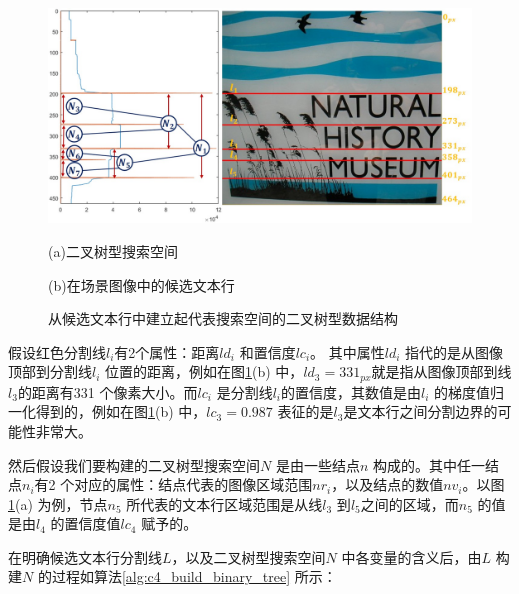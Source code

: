     \begin{figure}[!h]
    \centering
    \includegraphics[width=\textwidth]{./figures/c4_binary_tree_construction.jpg}
    \begin{minipage}[t]{0.40\linewidth}
    \centerline{\small (a)二叉树型搜索空间}
    \end{minipage}
    \begin{minipage}[t]{0.51\linewidth}
    \centerline{\small(b)在场景图像中的候选文本行}
    \end{minipage}
    \caption{从候选文本行中建立起代表搜索空间的二叉树型数据结构}
    \label{fig.c4_binary_tree_construction}
    \end{figure}

    假设红色分割线$l_i$有2个属性：距离$ld_i$ 和置信度$lc_i$。 其中属性$ld_i$ 指代的是从图像顶部到分割线$l_i$ 位置的距离，例如在图\ref{fig.c4_binary_tree_construction}(b) 中，$ld_3=331_{px}$就是指从图像顶部到线$l_3$的距离有331 个像素大小。而$lc_i$ 是分割线$l_i$的置信度，其数值是由$l_i$ 的梯度值归一化得到的，例如在图\ref{fig.c4_binary_tree_construction}(b) 中，$lc_3=0.987$ 表征的是$l_3$是文本行之间分割边界的可能性非常大。

    然后假设我们要构建的二叉树型搜索空间$N$ 是由一些结点$n$ 构成的。其中任一结点$n_i$有2 个对应的属性：结点代表的图像区域范围$nr_i$，以及结点的数值$nv_i$。以图\ref{fig.c4_binary_tree_construction}(a) 为例，节点$n_5$ 所代表的文本行区域范围是从线$l_3$ 到$l_5$之间的区域，而$n_5$ 的值是由$l_4$ 的置信度值$lc_4$ 赋予的。

    在明确候选文本行分割线$L$，以及二叉树型搜索空间$N$ 中各变量的含义后，由$L$ 构建$N$ 的过程如算法\ref{alg:c4_build_binary_tree} 所示：

